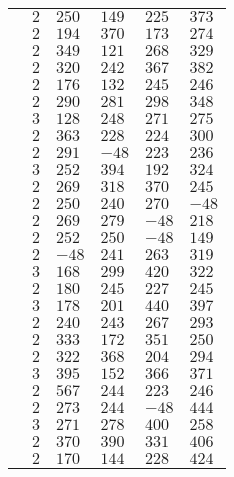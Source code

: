 \documentclass[12pt]{article}
\begin{document}
\begin{table}[]
\begin{tabular}{|l|l|l|l|l|l|}
                & $2$ & $250$ & $149$ & $225$ & $373$ \\
                & $2$ & $194$ & $370$ & $173$ & $274$ \\
                & $2$ & $349$ & $121$ & $268$ & $329$ \\
                & $2$ & $320$ & $242$ & $367$ & $382$ \\
                & $2$ & $176$ & $132$ & $245$ & $246$ \\
                & $2$ & $290$ & $281$ & $298$ & $348$ \\
                & $3$ & $128$ & $248$ & $271$ & $275$ \\
                & $2$ & $363$ & $228$ & $224$ & $300$ \\
                & $2$ & $291$ & $-48$ & $223$ & $236$ \\
                & $3$ & $252$ & $394$ & $192$ & $324$ \\
                & $2$ & $269$ & $318$ & $370$ & $245$ \\
                & $2$ & $250$ & $240$ & $270$ & $-48$ \\
                & $2$ & $269$ & $279$ & $-48$ & $218$ \\
                & $2$ & $252$ & $250$ & $-48$ & $149$ \\
                & $2$ & $-48$ & $241$ & $263$ & $319$ \\
                & $3$ & $168$ & $299$ & $420$ & $322$ \\
                & $2$ & $180$ & $245$ & $227$ & $245$ \\
                & $3$ & $178$ & $201$ & $440$ & $397$ \\
                & $2$ & $240$ & $243$ & $267$ & $293$ \\
                & $2$ & $333$ & $172$ & $351$ & $250$ \\
                & $2$ & $322$ & $368$ & $204$ & $294$ \\
                & $3$ & $395$ & $152$ & $366$ & $371$ \\
                & $2$ & $567$ & $244$ & $223$ & $246$ \\
                & $2$ & $273$ & $244$ & $-48$ & $444$ \\
                & $3$ & $271$ & $278$ & $400$ & $258$ \\
                & $2$ & $370$ & $390$ & $331$ & $406$ \\
                & $2$ & $170$ & $144$ & $228$ & $424$ \\

\end{tabular}
\end{table}
\end{document}
